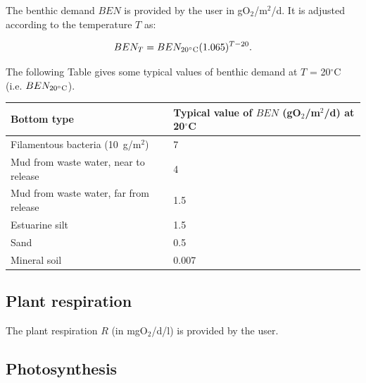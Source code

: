 The benthic demand $BEN$ is provided by the user in gO$_2$/m$^2$/d.
It is adjusted according to the temperature $T$ as:

\begin{equation}
  BEN_T = BEN_{20^\circ \rm{C}} (1.065)^{T-20}.
\end{equation}

The following Table gives some typical values of benthic demand
at $T$ = 20$^\circ$C (i.e. $BEN_{20^\circ \rm{C}}$).\\

\begin{table}[H]
 			\centering
\begin{tabular}{p{3.0in}p{3.0in}}
\hline
\multicolumn{1}{|p{3.0in}}{Bottom type} & 
\multicolumn{1}{|p{3.0in}|}{Typical value of $BEN$ (gO$_2$/m$^2$/d) at 20$^{\circ}$C} \\
\hline
\multicolumn{1}{|p{3.0in}}{Filamentous bacteria (10~g/m$^2$)} & 
\multicolumn{1}{|p{3.0in}|}{7} \\
\hline
\multicolumn{1}{|p{3.0in}}{Mud from waste water, near to release} & 
\multicolumn{1}{|p{3.0in}|}{4} \\
\hline
\multicolumn{1}{|p{3.0in}}{Mud from waste water, far from release } & 
\multicolumn{1}{|p{3.0in}|}{1.5} \\
\hline
\multicolumn{1}{|p{3.0in}}{Estuarine silt} & 
\multicolumn{1}{|p{3.0in}|}{1.5} \\
\hline
\multicolumn{1}{|p{3.0in}}{Sand} & 
\multicolumn{1}{|p{3.0in}|}{0.5} \\
\hline
\multicolumn{1}{|p{3.0in}}{Mineral soil} & 
\multicolumn{1}{|p{3.0in}|}{0.007} \\
\hline

\end{tabular}
\end{table}

\subsection{Plant respiration}

The plant respiration $R$ (in mgO$_2$/d/l) is provided by the user.

\subsection{Photosynthesis}

